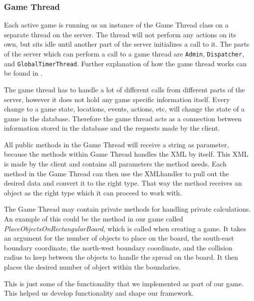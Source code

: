 \subsubsection{Game Thread}
\label{sec:gamethreadimpl}
Each active game is running as an instance of the Game Thread class on a separate thread on the server. The thread will not perform any actions on its own, but sits idle until another part of the server initializes a call to it. The parts of the server which can perform a call to a game thread are \texttt{Admin}, \texttt{Dispatcher}, and \texttt{GlobalTimerThread}. Further explanation  of how the game thread works can be found in . 

The game thread has to handle a lot of different calls from different parts of the server, however it does not hold any game specific information itself. Every change to a game state, locations, events, actions, etc, will change the state of a game in the database. Therefore the game thread acts as a connection between information stored in the database and the requests made by the client.

All public methods in the Game Thread will receive a string as parameter, because the methods within Game Thread handles the XML by itself. This XML is made by the client and contains all parameters the method needs. Each method in the Game Thread can then use the XMLhandler to pull out the desired data and convert it to the right type. That way the method receives an object as the right type which it can proceed to work with.

The Game Thread may contain private methods for handling private calculations. An example of this could be the  method in our game called \textit{PlaceObjectsOnRectangularBoard}, which is called when creating a game. It takes an argument for the number of objects to place on the board, the south-east boundary coordinate, the north-west boundary coordinate, and the collision radius to keep between the objects to handle the spread on the board. It then places the desired number of object within the boundaries.

This is just some of the functionality that we implemented as part of our game. This helped us develop functionality and shape our framework.